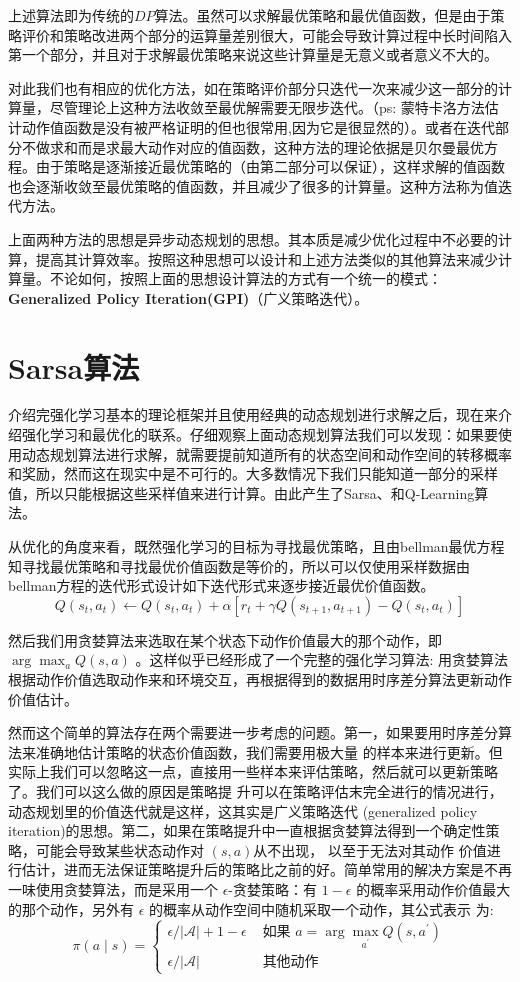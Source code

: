 上述算法即为传统的$DP$算法。虽然可以求解最优策略和最优值函数，但是由于策略评价和策略改进两个部分的运算量差别很大，可能会导致计算过程中长时间陷入第一个部分，并且对于求解最优策略来说这些计算量是无意义或者意义不大的。

对此我们也有相应的优化方法，如在策略评价部分只迭代一次来减少这一部分的计算量，尽管理论上这种方法收敛至最优解需要无限步迭代。（ps: 蒙特卡洛方法估计动作值函数是没有被严格证明的但也很常用,因为它是很显然的）。或者在迭代部分不做求和而是求最大动作对应的值函数，这种方法的理论依据是贝尔曼最优方程。由于策略是逐渐接近最优策略的（由第二部分可以保证），这样求解的值函数也会逐渐收敛至最优策略的值函数，并且减少了很多的计算量。这种方法称为值迭代方法。

上面两种方法的思想是异步动态规划的思想。其本质是减少优化过程中不必要的计算，提高其计算效率。按照这种思想可以设计和上述方法类似的其他算法来减少计算量。不论如何，按照上面的思想设计算法的方式有一个统一的模式：\textbf{ Generalized Policy Iteration(GPI)}（广义策略迭代）。

\section{Sarsa算法}
介绍完强化学习基本的理论框架并且使用经典的动态规划进行求解之后，现在来介绍强化学习和最优化的联系。仔细观察上面动态规划算法我们可以发现：如果要使用动态规划算法进行求解，就需要提前知道所有的状态空间和动作空间的转移概率和奖励，然而这在现实中是不可行的。大多数情况下我们只能知道一部分的采样值，所以只能根据这些采样值来进行计算。由此产生了Sarsa、和Q-Learning算法。

从优化的角度来看，既然强化学习的目标为寻找最优策略，且由bellman最优方程知寻找最优策略和寻找最优价值函数是等价的，所以可以仅使用采样数据由bellman方程的迭代形式设计如下迭代形式来逐步接近最优价值函数。
$$
Q\left(s_{t}, a_{t}\right) \leftarrow Q\left(s_{t}, a_{t}\right)+\alpha\left[r_{t}+\gamma Q\left(s_{t+1}, a_{t+1}\right)-Q\left(s_{t}, a_{t}\right)\right]
$$

然后我们用贪婪算法来选取在某个状态下动作价值最大的那个动作，即 $\arg \max _{a} Q(s, a)$ 。这样似乎已经形成了一个完整的强化学习算法: 用贪婪算法根据动作价值选取动作来和环境交互，再根据得到的数据用时序差分算法更新动作价值估计。

然而这个简单的算法存在两个需要进一步考虑的问题。第一，如果要用时序差分算法来准确地估计策略的状态价值函数，我们需要用极大量 的样本来进行更新。但实际上我们可以忽略这一点，直接用一些样本来评估策略，然后就可以更新策略了。我们可以这么做的原因是策略提 升可以在策略评估末完全进行的情况进行，动态规划里的价值迭代就是这样，这其实是广义策略迭代 (generalized policy iteration)的思想。第二，如果在策略提升中一直根据贪婪算法得到一个确定性策略，可能会导致某些状态动作对 $(s, a)$从不出现， 以至于无法对其动作 价值进行估计，进而无法保证策略提升后的策略比之前的好。简单常用的解决方案是不再一味使用贪婪算法，而是采用一个 $\epsilon$-贪婪策略：有 $1-\epsilon$ 的概率采用动作价值最大的那个动作，另外有 $\epsilon$ 的概率从动作空间中随机采取一个动作，其公式表示 为:
$$
\pi(a \mid s)= \begin{cases}\epsilon /|\mathcal{A}|+1-\epsilon & \text { 如果 } a=\arg \max _{a^{\prime}} Q\left(s, a^{\prime}\right) \\ \epsilon /|\mathcal{A}| & \text { 其他动作 }\end{cases}
$$

